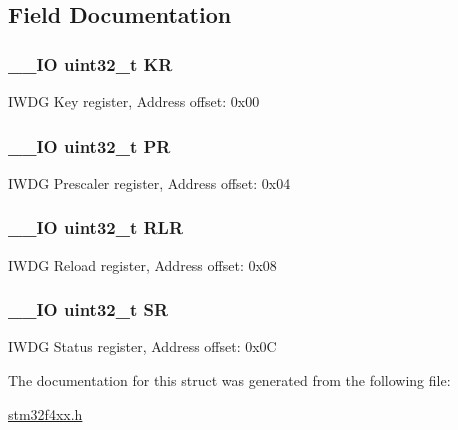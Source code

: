 \subsection{Field Documentation}
\hypertarget{struct_i_w_d_g___type_def_a2f692354bde770f2a5e3e1b294ec064b}{
\subsubsection[{K\-R}]{\setlength{\rightskip}{0pt plus 5cm}\-\_\-\-\_\-\-I\-O uint32\-\_\-t K\-R}}\label{struct_i_w_d_g___type_def_a2f692354bde770f2a5e3e1b294ec064b}
I\-W\-D\-G Key register, Address offset\-: 0x00 \hypertarget{struct_i_w_d_g___type_def_af8d25514079514d38c104402f46470af}{
\subsubsection[{P\-R}]{\setlength{\rightskip}{0pt plus 5cm}\-\_\-\-\_\-\-I\-O uint32\-\_\-t P\-R}}\label{struct_i_w_d_g___type_def_af8d25514079514d38c104402f46470af}
I\-W\-D\-G Prescaler register, Address offset\-: 0x04 \hypertarget{struct_i_w_d_g___type_def_a7015e1046dbd3ea8783b33dc11a69e52}{
\subsubsection[{R\-L\-R}]{\setlength{\rightskip}{0pt plus 5cm}\-\_\-\-\_\-\-I\-O uint32\-\_\-t R\-L\-R}}\label{struct_i_w_d_g___type_def_a7015e1046dbd3ea8783b33dc11a69e52}
I\-W\-D\-G Reload register, Address offset\-: 0x08 \hypertarget{struct_i_w_d_g___type_def_af6aca2bbd40c0fb6df7c3aebe224a360}{
\subsubsection[{S\-R}]{\setlength{\rightskip}{0pt plus 5cm}\-\_\-\-\_\-\-I\-O uint32\-\_\-t S\-R}}\label{struct_i_w_d_g___type_def_af6aca2bbd40c0fb6df7c3aebe224a360}
I\-W\-D\-G Status register, Address offset\-: 0x0\-C 

The documentation for this struct was generated from the following file\-:\begin{DoxyCompactItemize}
\item 
\hyperlink{stm32f4xx_8h}{stm32f4xx.\-h}\end{DoxyCompactItemize}
